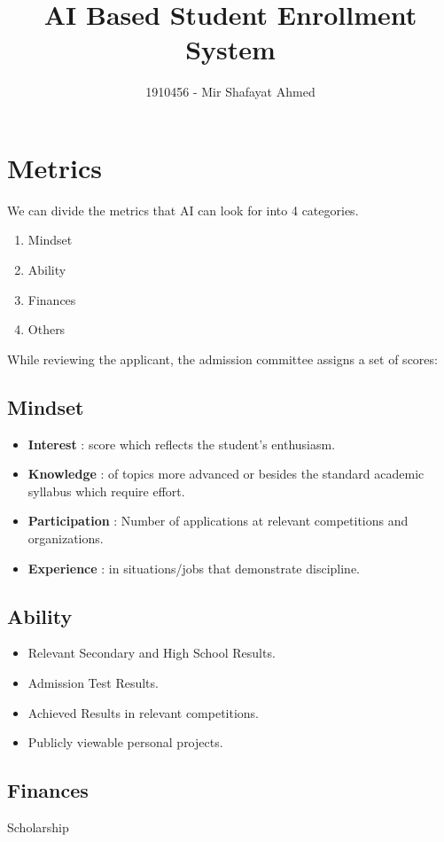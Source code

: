 \documentclass[11pt, a4paper]{article}
\title{AI Based Student Enrollment System}
\author{1910456 - Mir Shafayat Ahmed}
\begin{document}
    \pagecolor[HTML]{FFFFCC}
    \maketitle
    \section{Metrics}
        We can divide the metrics that AI can look for into 4 categories.
        \begin{enumerate}
            \item Mindset
            \item Ability
            \item Finances
            \item Others
        \end{enumerate}
        While reviewing the applicant, the admission committee assigns a set of scores:
        \subsection{Mindset}
            \begin{itemize}
                \item \textbf{Interest} : score which reflects the student's enthusiasm.
                \item \textbf{Knowledge} : of topics more advanced or besides the standard academic syllabus which require effort.
                \item \textbf{Participation} : Number of applications at relevant competitions and organizations.
                \item \textbf{Experience} : in situations/jobs that demonstrate discipline.
            \end{itemize}
        \subsection{Ability}
            \begin{itemize}
                \item Relevant Secondary and High School Results.
                \item Admission Test Results.
                \item Achieved Results in relevant competitions.
                \item Publicly viewable personal projects.
            \end{itemize}
        \subsection{Finances}
            Scholarship 
            
\end{document}
